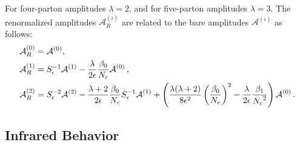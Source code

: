 For four-parton amplitudes $\lambda=2$, and for five-parton 
amplitudes $\lambda=3$.
The renormalized amplitudes $\mathcal{A}_R^{(i)}$ are related 
to the bare amplitudes $\mathcal{A}^{(i)}$ as follows:
\begin{align}
  \begin{split}
    \label{eq:twoLoopUnRenorm}
    &\mathcal{A}_R^{(0)}=\mathcal{A}^{(0)}, \\
    & \mathcal{A}_R^{(1)}=S_{\epsilon}^{-1}\mathcal{A}^{(1)}
    -\frac{\lambda}{2\epsilon}\frac{\beta_0}{{N_c}}
    \mathcal{A}^{(0)}\,,\\
    &\mathcal{A}_R^{(2)}=
    S_{\epsilon}^{-2}\mathcal{A}^{(2)}
    -\frac{\lambda+2}{2\epsilon}\frac{\beta_0}{{N_c}}S_{\epsilon}^
    {-1}
    \mathcal{A}^{(1)}
    +\left(\frac{\lambda(\lambda+2)}{8\epsilon^2}\left(\frac{\beta_0}
    {{N_c}}\right)^2
    -\frac{\lambda}{2\epsilon}\frac{\beta_1}{{N_c}^2}\right)
    \mathcal{A}^{
    (0)}\,.
  \end{split}
\end{align}



\subsection{Infrared Behavior}

